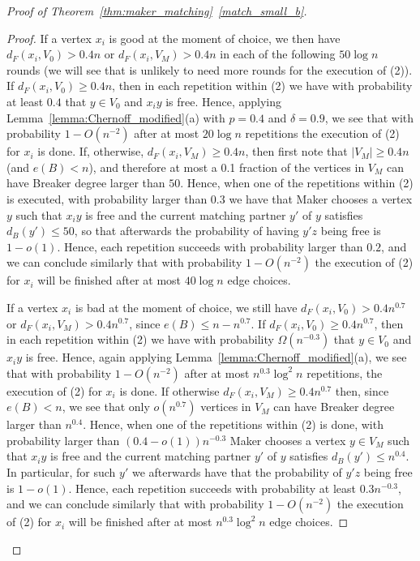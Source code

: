 \documentclass[11pt, a4paper]{article}
\numberwithin{equation}{section}
\numberwithin{figure}{section}
\begin{document}
\begin{proof}[Proof of Theorem~\ref{thm:maker_matching}~\ref{match_small_b}]
\begin{proof}
If a vertex $x_i$ is good at the moment of choice,
we then have $d_F(x_i,V_0)>0.4n$ or $d_F(x_i,V_M)>0.4n$
in each of the following $50 \log n$ rounds (we will see that is unlikely to need more rounds for the execution of (2)).
If $d_F(x_i,V_0)\geq 0.4n$, then in each repetition within (2)
we have with probability at least $0.4$ that $y\in V_0$ and $x_iy$ is free. Hence, 
applying Lemma~\ref{lemma:Chernoff_modified}(a)
with $p=0.4$ and $\delta=0.9$,
we see that with probability $1-O(n^{-2})$ after at most $20\log n $ repetitions the execution of (2) for $x_i$ is done.
If, otherwise, $d_F(x_i,V_M)\geq 0.4n$,
then first note that $|V_M|\geq 0.4 n$ (and $e(B)<n$),
and therefore at most a 0.1 fraction of the vertices in $V_M$
can have Breaker degree larger than $50$. Hence,
when one of the repetitions within (2) is executed,
with probability larger than $0.3$ we have that
Maker chooses a vertex $y$ such that
$x_iy$ is free and the current matching partner $y'$ of $y$
satisfies $d_B(y')\leq 50$, so that afterwards
the probability of having $y'z$ being free is $1-o(1)$.
Hence, each repetition succeeds with probability larger than $0.2$,
and we can conclude similarly that with probability $1-O(n^{-2})$ 
the execution of (2) for $x_i$ will be finished after at most $40 \log n$ edge choices.

If a vertex $x_i$ is bad at the moment of choice,
we still have
$d_F(x_i,V_0)>0.4n^{0.7}$ or $d_F(x_i,V_M)>0.4n^{0.7}$,
since $e(B)\leq n-n^{0.7}$.
If $d_F(x_i,V_0)\geq 0.4n^{0.7}$, then in each repetition within (2)
we have with probability $\Omega(n^{-0.3})$ that $y\in V_0$ and $x_iy$ is free. Hence, 
again applying Lemma~\ref{lemma:Chernoff_modified}(a),
we see that with probability $1-O(n^{-2})$ after at most $n^{0.3}\log^2 n$ repetitions, the execution of (2) for $x_i$ is done.
If otherwise $d_F(x_i,V_M)\geq 0.4n^{0.7}$
then, since $e(B)<n$, we see that
only $o(n^{0.7})$ vertices in $V_M$
can have Breaker degree larger than $n^{0.4}$. Hence,
when one of the repetitions within (2) is done,
with probability larger than $(0.4 - o(1))n^{-0.3}$
Maker chooses a vertex $y\in V_M$ such that
$x_iy$ is free and the current matching partner $y'$ of $y$
satisfies $d_B(y')\leq n^{0.4}$. In particular, for such $y'$ 
we afterwards have that
the probability of $y'z$ being free is $1-o(1)$.
Hence, each repetition succeeds with probability at least $0.3n^{-0.3}$,
and we can conclude similarly that with probability $1-O(n^{-2})$ 
the execution of (2) for $x_i$ will be finished after at most $n^{0.3}\log^2 n$ edge choices.


\end{proof}
\end{proof}
\end{document}
